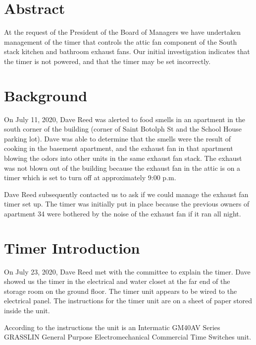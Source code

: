 \documentclass[letterpaper,12pt]{texMemo}
\begin{document}
\maketitle

\section{Abstract}

At the request of the President of the Board of Managers we have undertaken
management of the timer that controls the attic fan component of the South
stack kitchen and bathroom exhaust fans. Our initial investigation indicates
that the timer is not powered, and that the timer may be set incorrectly.

\section{Background}

On July 11, 2020, Dave Reed was alerted to food smells
in an apartment in the south corner of the building (corner of Saint
Botolph St and the School House parking lot). Dave was able to
determine that the smells were the result of cooking in the basement
apartment, and the exhaust fan in that apartment blowing the odors
into other units in the same exhaust fan stack. The exhaust was not
blown out of the building because the exhaust fan in the attic is on
a timer which is set to turn off at approximately 9:00 p.m.

Dave Reed subsequently contacted us to ask if we could manage the
exhaust fan timer set up. The timer was initially put in place because
the previous owners of apartment 34 were bothered by the noise of
the exhaust fan if it ran all night.

\section{Timer Introduction}

On July 23, 2020, Dave Reed met with the committee to explain
the timer. Dave showed us the timer in the electrical and water closet at
the far end of the storage room on the ground floor. The timer unit appears
to be wired to the electrical panel. The instructions for the timer unit are
on a sheet of paper stored inside the unit.

According to the instructions the unit is an Intermatic GM40AV Series
GRASSLIN General Purpose Electromechanical Commercial Time Switches unit.
\end{document}
